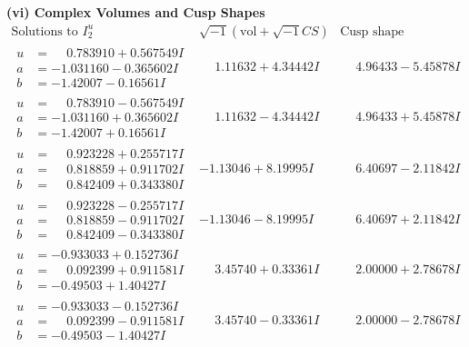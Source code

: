 \documentclass[1p]{elsarticle_modified}
\theoremstyle{definition}
\newcommand{\I}{\sqrt{-1}}
\begin{document}
\newpage\flushleft \textbf{(vi) Complex Volumes and Cusp Shapes}
$$\begin{array}{c|c|c}  
\text{Solutions to }I^u_{2}& \I (\text{vol} + \sqrt{-1}CS) & \text{Cusp shape}\\
 \hline 
\begin{aligned}
u &= \phantom{-}0.783910 + 0.567549 I \\
a &= -1.031160 - 0.365602 I \\
b &= -1.42007 - 0.16561 I\end{aligned}
 & \phantom{-}1.11632 + 4.34442 I & \phantom{-}4.96433 - 5.45878 I \\ \hline\begin{aligned}
u &= \phantom{-}0.783910 - 0.567549 I \\
a &= -1.031160 + 0.365602 I \\
b &= -1.42007 + 0.16561 I\end{aligned}
 & \phantom{-}1.11632 - 4.34442 I & \phantom{-}4.96433 + 5.45878 I \\ \hline\begin{aligned}
u &= \phantom{-}0.923228 + 0.255717 I \\
a &= \phantom{-}0.818859 + 0.911702 I \\
b &= \phantom{-}0.842409 + 0.343380 I\end{aligned}
 & -1.13046 + 8.19995 I & \phantom{-}6.40697 - 2.11842 I \\ \hline\begin{aligned}
u &= \phantom{-}0.923228 - 0.255717 I \\
a &= \phantom{-}0.818859 - 0.911702 I \\
b &= \phantom{-}0.842409 - 0.343380 I\end{aligned}
 & -1.13046 - 8.19995 I & \phantom{-}6.40697 + 2.11842 I \\ \hline\begin{aligned}
u &= -0.933033 + 0.152736 I \\
a &= \phantom{-}0.092399 + 0.911581 I \\
b &= -0.49503 + 1.40427 I\end{aligned}
 & \phantom{-}3.45740 + 0.33361 I & \phantom{-}2.00000 + 2.78678 I \\ \hline\begin{aligned}
u &= -0.933033 - 0.152736 I \\
a &= \phantom{-}0.092399 - 0.911581 I \\
b &= -0.49503 - 1.40427 I\end{aligned}
 & \phantom{-}3.45740 - 0.33361 I & \phantom{-}2.00000 - 2.78678 I \\ \hline\begin{aligned}

\end{aligned}
\end{array}$$
\end{document}
